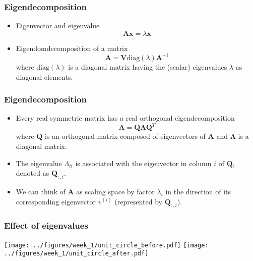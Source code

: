 \documentclass[notes]{beamer}          %
\newcommand{\vect}[1]{\bm{#1}}
\begin{document}
\begin{frame}
\frametitle{Eigendecomposition}
    \begin{itemize}
        \item Eigenvector and eigenvalue
        $$ \vect{A}\vect{x} = \lambda \vect{x}$$
        \item Eigendomdecomposition of a matrix
        $$ \vect{A} = \vect{V} \mbox{diag}(\lambda) \vect{A}^{-1}$$
        where $\mbox{diag}(\lambda)$ is a diagonal matrix having the (scalar) eigenvalues $\lambda$ as diagonal elements.
    \end{itemize}

\end{frame}

\begin{frame}
\frametitle{Eigendecomposition}
    \begin{itemize}
        \item Every real symmetric matrix has a real orthogonal eigendecomposition
        $$ \vect{A} = \vect{Q} \vect{\Lambda} \vect{Q}^T $$
        where $\vect{Q}$ is an orthogonal matrix composed of eigenvectors of $\vect{A}$ and $\vect{\Lambda}$ is a diagonal matrix.
        \item The eigenvalue $\Lambda_{ii}$ is associated with the eigenvector in column $i$ of $\vect{Q}$, denoted as $\vect{Q}_{:,i}$.
        \item We can think of $\vect{A}$ as scaling space by factor $\lambda_i$ in the direction of its corresponding eigenvector $v^{(i)}$ (represented by $\vect{Q}_{:,i}$).
    \end{itemize}

\end{frame}

\begin{frame}
\frametitle{Effect of eigenvalues}

\begin{center}
\texttt{[image: ../figures/week\_1/unit\_circle\_before.pdf]}
\hfill
\texttt{[image: ../figures/week\_1/unit\_circle\_after.pdf]}
\end{center}

\end{frame}
\end{document}
